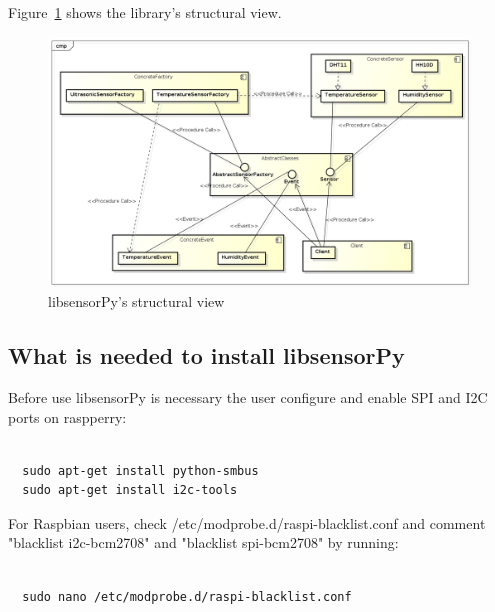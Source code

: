 \documentclass{acm_proc_article-sp}
\begin{document}
Figure~\ref{fig:view} shows the library's structural view.
\begin{figure}[ht]
    \includegraphics[width=1.0\textwidth,natwidth=610,natheight=642]{pictures/VisaoEstrutural.png}
    \caption{libsensorPy's structural view}
    \label{fig:view}
\end{figure}

\subsection{What is needed to install libsensorPy}
Before use libsensorPy is necessary the user configure and enable SPI and I2C ports on raspperry:
\renewcommand{\theFancyVerbLine}{
  \sffamily\textcolor[rgb]{0.5,0.5,0.5}{\scriptsize\arabic{FancyVerbLine}}}
\begin{verbatim}

  sudo apt-get install python-smbus
  sudo apt-get install i2c-tools	

\end{verbatim}

For Raspbian users, check /etc/modprobe.d/raspi-blacklist.conf and comment "blacklist i2c-bcm2708" and "blacklist spi-bcm2708" by running:

\renewcommand{\theFancyVerbLine}{
  \sffamily\textcolor[rgb]{0.5,0.5,0.5}{\scriptsize\arabic{FancyVerbLine}}}
\begin{verbatim}

  sudo nano /etc/modprobe.d/raspi-blacklist.conf	

\end{verbatim}
\end{document}
